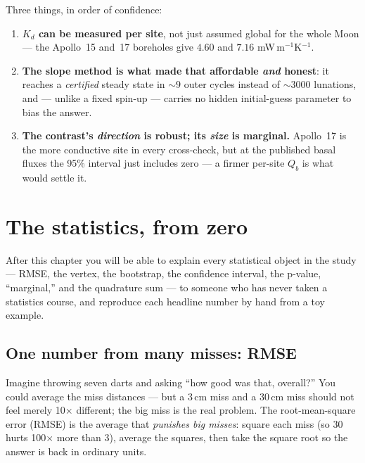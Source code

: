\documentclass[11pt]{report}
\begin{document}
\begin{keypt}[title={What to take away}]
Three things, in order of confidence:
\begin{enumerate}[leftmargin=1.5em,itemsep=1pt]
\item \textbf{$K_d$ can be measured per site}, not just assumed global for the
  whole Moon --- the Apollo~15 and~17 boreholes give $4.60$ and $7.16$
  mW\,m$^{-1}$K$^{-1}$.
\item \textbf{The slope method is what made that affordable \emph{and} honest}:
  it reaches a \emph{certified} steady state in ${\sim}9$ outer cycles instead of
  ${\sim}3000$ lunations, and --- unlike a fixed spin-up --- carries no hidden
  initial-guess parameter to bias the answer.
\item \textbf{The contrast's \emph{direction} is robust; its \emph{size} is
  marginal.} Apollo~17 is the more conductive site in every cross-check, but at
  the published basal fluxes the 95\% interval just includes zero --- a firmer
  per-site $Q_b$ is what would settle it.
\end{enumerate}
\end{keypt}

\chapter{The statistics, from zero}\label{ch:statszero}

After this chapter you will be able to explain every statistical object in the
study --- RMSE, the vertex, the bootstrap, the confidence interval, the
p-value, ``marginal,'' and the quadrature sum --- to someone who has never
taken a statistics course, and reproduce each headline number by hand from a
toy example.

\section{One number from many misses: RMSE}\label{sec:rmsezero}

\begin{plain}
Imagine throwing seven darts and asking ``how good was that, overall?'' You
could average the miss distances --- but a 3\,cm miss and a 30\,cm miss should
not feel merely 10$\times$ different; the big miss is the real problem. The
root-mean-square error (RMSE) is the average that \emph{punishes big misses}:
square each miss (so 30 hurts 100$\times$ more than 3), average the squares,
then take the square root so the answer is back in ordinary units.
\end{plain}
\end{document}
